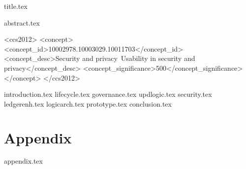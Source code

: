 \documentclass[sigconf, anonymous]{acmart}
\begin{document}
{title.tex}


{abstract.tex}



\begin{CCSXML}
<ccs2012>
<concept>
<concept_id>10002978.10003029.10011703</concept_id>
<concept_desc>Security and privacy~Usability in security and privacy</concept_desc>
<concept_significance>500</concept_significance>
</concept>
</ccs2012>
\end{CCSXML}





{introduction.tex}
{lifecycle.tex}
{governance.tex}
{updlogic.tex}
{security.tex}
{ledgerenh.tex}
{logicarch.tex}
{prototype.tex}
{conclusion.tex}


\ifshort\else
\appendix
\section*{Appendix}
{appendix.tex}
\fi



\end{document}
